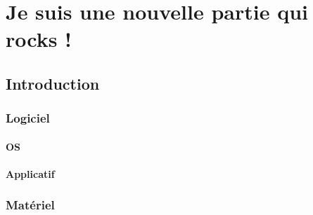 



\maketitle
\tableofcontents 

\part{Je suis une nouvelle partie qui rocks !}
\chapter{Introduction}
\section{Logiciel}
\subsection{OS}
\subsection{Applicatif}
\section{Matériel}


